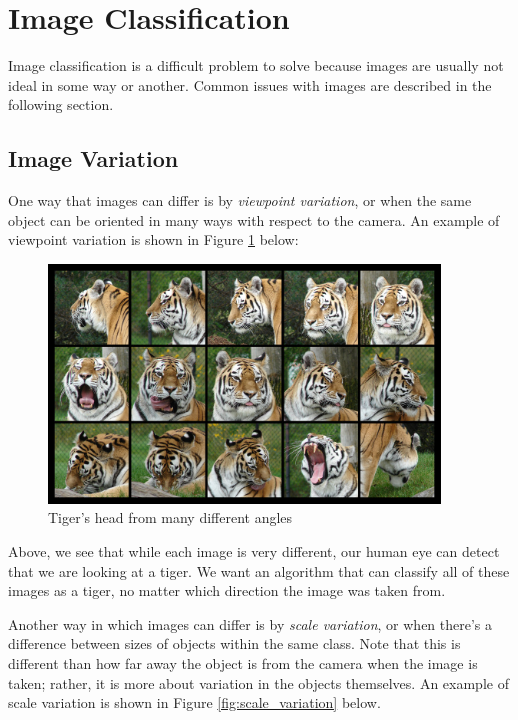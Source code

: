 \newpage
\section{Image Classification}\label{ch:image_classification} Image
classification is a difficult problem to solve because images are usually not
ideal in some way or another. Common issues with images are described in the
following section.

\subsection{Image Variation} One way that images can differ is by
\textit{viewpoint variation}, or when the same object can be oriented in many
ways with respect to the camera. An example of viewpoint variation is shown in
Figure \ref{fig:viewpoint} below:

\begin{figure}[ht!] \centering
\includegraphics[height=2.5in]{../figures/cat_viewpoint_variation.jpg}
\caption{Tiger's head from many different angles} \label{fig:viewpoint}
\end{figure}

\noindent Above, we see that while each image is very different, our human eye
can detect that we are looking at a tiger. We want an algorithm that can
classify all of these images as a tiger, no matter which direction the image
was taken from.

\noindent Another way in which images can differ is by \textit{scale
variation}, or when there's a difference between sizes of objects within the
same class. Note that this is different than how far away the object is from
the camera when the image is taken; rather, it is more about variation in the
objects themselves.  An example of scale variation is shown in Figure
\ref{fig:scale_variation} below.

\newpage

